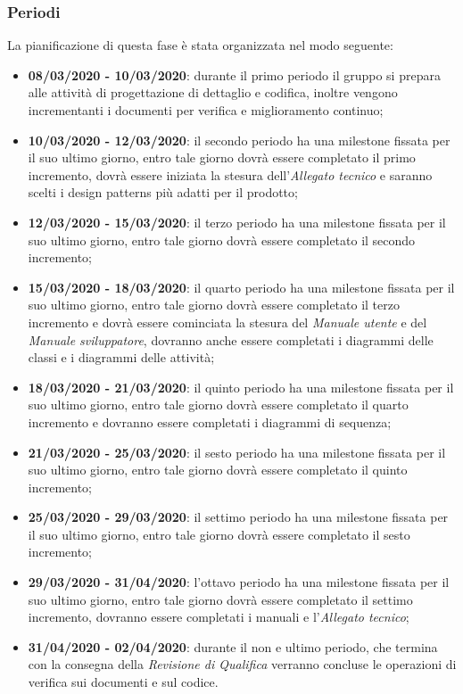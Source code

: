 \subsubsection{Periodi}
La pianificazione di questa fase è stata organizzata nel modo seguente:
\begin{itemize}
\item \textbf{08/03/2020 - 10/03/2020}: durante il primo periodo il gruppo si prepara alle attività di progettazione di dettaglio e codifica, inoltre vengono incrementanti i documenti per verifica e miglioramento continuo;

\item \textbf{10/03/2020 - 12/03/2020}: il secondo periodo ha una milestone fissata per il suo ultimo giorno, entro tale giorno dovrà essere completato il primo incremento, dovrà essere iniziata la stesura dell'\textit{Allegato tecnico} e saranno scelti i design patterns più adatti per il prodotto;

\item \textbf{12/03/2020 - 15/03/2020}: il terzo periodo ha una milestone fissata per il suo ultimo giorno, entro tale giorno dovrà essere completato il secondo incremento;

\item \textbf{15/03/2020 - 18/03/2020}: il quarto periodo ha una milestone fissata per il suo ultimo giorno, entro tale giorno dovrà essere completato il terzo incremento e dovrà essere cominciata la stesura del \textit{Manuale utente} e del \textit{Manuale sviluppatore}, dovranno anche essere completati i diagrammi delle classi e i diagrammi delle attività;

\item \textbf{18/03/2020 - 21/03/2020}: il quinto periodo ha una milestone fissata per il suo ultimo giorno, entro tale giorno dovrà essere completato il quarto incremento e dovranno essere completati i diagrammi di sequenza;

\item \textbf{21/03/2020 - 25/03/2020}: il sesto periodo ha una milestone fissata per il suo ultimo giorno, entro tale giorno dovrà essere completato il quinto incremento;

\item \textbf{25/03/2020 - 29/03/2020}: il settimo periodo ha una milestone fissata per il suo ultimo giorno, entro tale giorno dovrà essere completato il sesto incremento;

\item \textbf{29/03/2020 - 31/04/2020}: l'ottavo periodo ha una milestone fissata per il suo ultimo giorno, entro tale giorno dovrà essere completato il settimo incremento, dovranno essere completati i manuali e l'\textit{Allegato tecnico};

\item \textbf{31/04/2020 - 02/04/2020}: durante il non e ultimo periodo, che termina con la consegna della \textit{Revisione di Qualifica} verranno concluse le operazioni di verifica sui documenti e sul codice.

\end{itemize}

